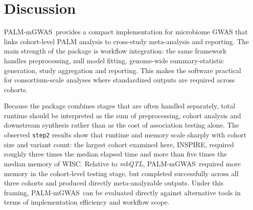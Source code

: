 \documentclass[10pt,twocolumn]{article}
\newcommand{\software}{PALM-mGWAS}
\begin{document}

\section{Discussion}
\software\ provides a compact implementation for microbiome GWAS that links cohort-level PALM analysis to cross-study meta-analysis and reporting. The main strength of the package is workflow integration: the same framework handles preprocessing, null model fitting, genome-wide summary-statistic generation, study aggregation and reporting. This makes the software practical for consortium-scale analyses where standardized outputs are required across cohorts.

Because the package combines stages that are often handled separately, total runtime should be interpreted as the sum of preprocessing, cohort analysis and downstream synthesis rather than as the cost of association testing alone. The observed \texttt{step2} results show that runtime and memory scale sharply with cohort size and variant count: the largest cohort examined here, INSPIRE, required roughly three times the median elapsed time and more than five times the median memory of WISC. Relative to \textit{mbQTL}, \software\ required more memory in the cohort-level testing stage, but completed successfully across all three cohorts and produced directly meta-analyzable outputs. Under this framing, \software\ can be evaluated directly against alternative tools in terms of implementation efficiency and workflow scope.
\end{document}
